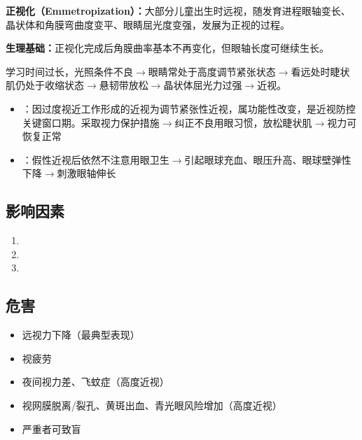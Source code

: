 \begin{keybox}
\textbf{正视化（Emmetropization）：}大部分儿童出生时远视，随发育进程眼轴变长、晶状体和角膜弯曲度变平、眼睛屈光度变强，发展为正视的过程。

\textbf{生理基础：}正视化完成后角膜曲率基本不再变化，但眼轴长度可继续生长。

学习时间过长，光照条件不良$\rightarrow$眼睛常处于高度调节紧张状态$\rightarrow$看远处时睫状肌仍处于收缩状态$\rightarrow$悬韧带放松$\rightarrow$晶状体屈光力过强$\rightarrow$近视。

\begin{itemize}[leftmargin=*]
    \item {}：因过度视近工作形成的近视为调节紧张性近视，属功能性改变，是近视防控关键窗口期。采取视力保护措施$\rightarrow$纠正不良用眼习惯，放松睫状肌$\rightarrow$视力可恢复正常
    \item {}：假性近视后依然不注意用眼卫生$\rightarrow$引起眼球充血、眼压升高、眼球壁弹性下降$\rightarrow$刺激眼轴伸长
\end{itemize}
\end{keybox}

\subsection{影响因素}

\begin{keybox}
\begin{enumerate}[leftmargin=*]
    \item {}
    \item {}
    \item {}
\end{enumerate}
\end{keybox}

\subsection{危害}

\begin{keybox}
\begin{itemize}[leftmargin=*]
    \item 远视力下降（最典型表现）
    \item 视疲劳
    \item 夜间视力差、飞蚊症（高度近视）
    \item 视网膜脱离/裂孔、黄斑出血、青光眼风险增加（高度近视）
    \item 严重者可致盲
\end{itemize}
\end{keybox}

